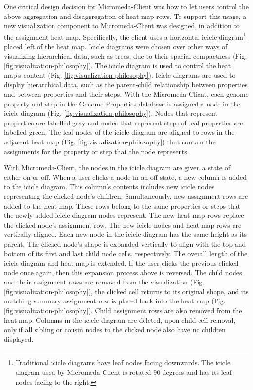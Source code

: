 One critical design decision for Micromeda-Client was how to let users control 
the above aggregation and disaggregation of heat map rows. To support this 
usage, a new visualization component to Micromeda-Client was designed, in 
addition to the assignment heat map. Specifically, the client uses a horizontal 
icicle diagram\footnote{Traditional icicle diagrams have leaf nodes facing 
downwards. The icicle diagram used by Micromeda-Client is rotated 90 degrees and 
has its leaf nodes facing to the right.} placed left of the heat map. Icicle 
diagrams were chosen over other ways of visualizing hierarchical data, such as 
trees, due to their spacial compactness (Fig. 
\ref{fig:visualization-philosophy}). The icicle diagram is used to control the 
heat map's content (Fig. \ref{fig:visualization-philosophy}). Icicle diagrams 
are used to display hierarchical data, such as the parent-child relationship 
between properties and between properties and their steps. With the 
Micromeda-Client, each genome property and step in the Genome Properties 
database is assigned a node in the icicle diagram (Fig. 
\ref{fig:visualization-philosophy}). Nodes that represent properties are 
labelled gray and nodes that represent steps of leaf properties are labelled 
green. The leaf nodes of the icicle diagram are aligned to rows in the adjacent 
heat map (Fig. \ref{fig:visualization-philosophy}) that contain the assignments 
for the property or step that the node represents.

With Micromeda-Client, the nodes in the icicle diagram are given a state of 
either on or off. When a user clicks a node in an off state, a new column is 
added to the icicle diagram. This column's contents includes new icicle nodes 
representing the clicked node's children. Simultaneously, new assignment rows 
are added to the heat map. These rows belong to the same properties or steps 
that the newly added icicle diagram nodes represent. The new heat map rows 
replace the clicked node's assignment row. The new icicle nodes and heat map 
rows are vertically aligned. Each new node in the icicle diagram has the same 
height as its parent. The clicked node's shape is expanded vertically to align 
with the top and bottom of its first and last child node cells, respectively. 
The overall length of the icicle diagram and heat map is extended. If the user 
clicks the previous clicked node once again, then this expansion process above 
is reversed. The child nodes and their assignment rows are removed from the 
visualization (Fig. \ref{fig:visualization-philosophy}), the clicked cell 
returns to its original shape, and its matching summary assignment row is placed 
back into the heat map (Fig. \ref{fig:visualization-philosophy}). Child 
assignment rows are also removed from the heat map. Columns in the icicle 
diagram are deleted, upon child cell removal, only if all sibling or cousin 
nodes to the clicked node also have no children displayed.

